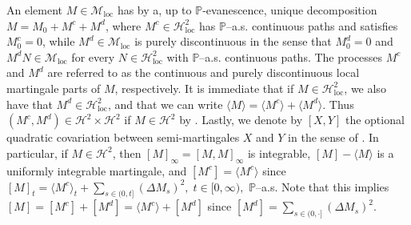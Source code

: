 \documentclass[10pt]{article} %
\newcommand\cH{\mathcal H}
\newcommand\cM{\mathcal M}
\def \P{\mathbb{P}}
\begin{document}
\medskip
An element $M \in \cM_\mathrm{loc}$ has by \cite[Theorem I.4.18]{jacod2003limit} a, up to $\P$-evanescence, unique decomposition $M = M_0 + M^c +M^d$, where $M^c \in \cH^2_\mathrm{loc}$ has $\P$--a.s. continuous paths and satisfies $M^c_0 = 0$, while $M^d \in \cM_\mathrm{loc}$ is purely discontinuous in the sense that $M^d_0 = 0$ and $M^d N \in \cM_\mathrm{loc}$ for every $N \in \cH^2_\mathrm{loc}$ with $\P$--a.s. continuous paths. The processes $M^c$ and $M^d$ are referred to as the continuous and purely discontinuous local martingale parts of $M$, respectively. It is immediate that if $M \in \cH^2_\mathrm{loc}$, we also have that $M^d \in \cH^2_\mathrm{loc}$, and that we can write $\langle M \rangle = \langle M^c \rangle + \langle M^d \rangle$. Thus $(M^c,M^d) \in \cH^2 \times\cH^2$ if $M \in \cH^2$ by \cite[Th\'eor\`eme 2.34]{jacod1979calcul}. Lastly, we denote by $[X,Y]$ the optional quadratic covariation between semi-martingales $X$ and $Y$ in the sense of \cite[Definition I.4.45]{jacod2003limit}. In particular, if $M \in \cH^2$, then $[M]_\infty = [M,M]_\infty$ is integrable, $[M] - \langle M \rangle$ is a uniformly integrable martingale, and $[M^c] = \langle M^c \rangle$ since $[M]_t = \langle M^c \rangle_t + \sum_{s \in (0,t]} (\Delta M_s)^2, \; t \in [0,\infty),$ $\P$--a.s. Note that this implies $[M] = [M^c] + [M^d] = \langle M^c \rangle + [M^d]$ since $[M^d] = \sum_{s \in (0,\cdot]}(\Delta M_s)^2$.
\end{document}
